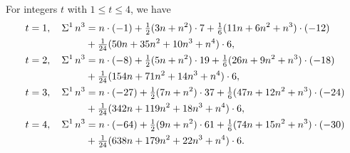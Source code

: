 \begin{example} For integers $t$ with $1 \leq t \leq 4$, we have
  \begin{align*}
    t=1, \quad \Sigma^{1}\,{n}^{3}
    &=
    n \cdot (-1)
    + \tfrac{1}{2}(3n+n^2)\cdot 7
    + \tfrac{1}{6}(11n+6n^2+n^3)\cdot (-12) \\
    &+ \tfrac{1}{24}(50n+35n^2+10n^3+n^4)\cdot 6,
    \\
    t=2, \quad \Sigma^{1}\,{n}^{3}
    &=
    n \cdot (-8)
    + \tfrac{1}{2}(5n+n^2)\cdot 19
    + \tfrac{1}{6}(26n+9n^2+n^3)\cdot (-18) \\
    &+ \tfrac{1}{24}(154n+71n^2+14n^3+n^4)\cdot 6,
    \\
    t=3, \quad \Sigma^{1}\,{n}^{3}
    &=
    n \cdot (-27)
    + \tfrac{1}{2}(7n+n^2)\cdot 37
    + \tfrac{1}{6}(47n+12n^2+n^3)\cdot (-24) \\
    &+ \tfrac{1}{24}(342n+119n^2+18n^3+n^4)\cdot 6,
    \\
    t=4, \quad \Sigma^{1}\,{n}^{3}
    &=
    n \cdot (-64)
    + \tfrac{1}{2}(9n+n^2)\cdot 61
    + \tfrac{1}{6}(74n+15n^2+n^3)\cdot (-30) \\
    &+ \tfrac{1}{24}(638n+179n^2+22n^3+n^4)\cdot 6.
  \end{align*}
\end{example}
